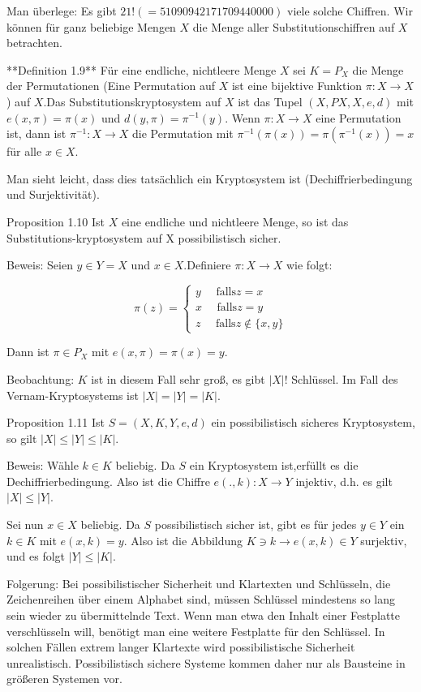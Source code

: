 \documentclass[a4paper]{article}
\begin{document}
\begin{multicols}{3}
    Man überlege: Es gibt $21!(= 51090942171709440000)$ viele solche Chiffren. Wir können für ganz beliebige Mengen $X$ die Menge aller Substitutionschiffren auf $X$ betrachten.

    **Definition 1.9** Für eine endliche, nichtleere Menge $X$ sei $K=P_X$ die Menge der Permutationen (Eine Permutation auf $X$ ist eine bijektive Funktion $\pi:X\rightarrow X$) auf $X$.Das Substitutionskryptosystem auf $X$ ist das Tupel $(X,PX,X,e,d)$
    mit $e(x,\pi)=\pi(x)$ und $d(y,\pi)=\pi^{-1} (y)$.
    Wenn $\pi:X\rightarrow X$ eine Permutation ist, dann ist $\pi^{-1}:X\rightarrow X$ die Permutation mit $\pi^{-1}(\pi(x))=\pi(\pi^{-1}(x)) =x$ für alle $x\in X$.

    Man sieht leicht, dass dies tatsächlich ein Kryptosystem ist (Dechiffrierbedingung und Surjektivität).

    Proposition 1.10 Ist $X$ eine endliche und nichtleere Menge, so ist das Substitutions-kryptosystem auf X possibilistisch sicher.

    Beweis: Seien $y\in Y =X$ und $x\in X$.Definiere $\pi:X\rightarrow X$ wie folgt:

    $$\pi(z) =\begin{cases} y\quad\text{ falls} z=x\\ x\quad\text{ falls} z=y\\ z\quad\text{ falls} z\not\in\{x,y\} \end{cases}$$

    Dann ist $\pi\in P_X$ mit $e(x,\pi)=\pi(x)=y$.

    Beobachtung: $K$ ist in diesem Fall sehr groß, es gibt $|X|!$ Schlüssel. Im Fall des Vernam-Kryptosystems ist $|X|=|Y|=|K|$.

    Proposition 1.11 Ist $S=(X,K,Y,e,d)$ ein possibilistisch sicheres Kryptosystem, so gilt $|X|\leq|Y|\leq|K|$.

    Beweis: Wähle $k\in K$ beliebig. Da $S$ ein Kryptosystem ist,erfüllt es die Dechiffrierbedingung. Also ist die Chiffre $e(.,k):X\rightarrow Y$ injektiv, d.h. es gilt $|X|\leq |Y|$.

    Sei nun $x\in X$ beliebig. Da $S$ possibilistisch sicher ist, gibt es für jedes $y\in Y$ ein $k\in K$ mit $e(x,k) =y$. Also ist die Abbildung $K\ni k\rightarrow e(x,k)\in Y$ surjektiv, und es folgt $|Y|\leq |K|$.

    Folgerung: Bei possibilistischer Sicherheit und Klartexten und Schlüsseln, die Zeichenreihen über einem Alphabet sind, müssen Schlüssel mindestens so lang sein wieder zu übermittelnde Text. Wenn man etwa den Inhalt einer Festplatte verschlüsseln will, benötigt man eine weitere Festplatte für den Schlüssel. In solchen Fällen extrem langer Klartexte wird possibilistische Sicherheit unrealistisch. Possibilistisch sichere Systeme kommen daher nur als Bausteine in größeren Systemen vor.


\end{multicols}
\end{document}

